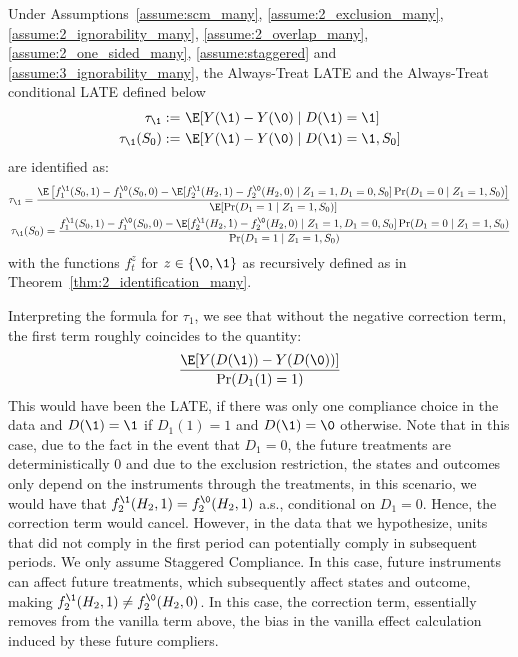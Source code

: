 \begin{theorem}\label{thm:late11_id_many}
    Under Assumptions~\ref{assume:scm_many}, 
 \ref{assume:2_exclusion_many},
 \ref{assume:2_ignorability_many}, \ref{assume:2_overlap_many}, \ref{assume:2_one_sided_many}, \ref{assume:staggered} and \ref{assume:3_ignorability_many}, the Always-Treat LATE and the Always-Treat conditional LATE defined below
    \begin{align}
        \tau_{\1} :=~& \E[Y(\1) - Y(\0)\mid D(\1)=\1]\\
        \tau_{\1}(S_0):=~& \E[Y(\1) - Y(\0)\mid D(\1)=\1, S_0]
    \end{align}
    are identified as:
    \begin{align*}
    \tau_\1 = \frac{\E\left[f_1^{\1}(S_0,1) - f_1^{\0}(S_0, 0) - \E[f_2^{\1}(H_2, 1) - f_2^{\0}(H_2,0)\mid Z_1=1, D_1=0, S_0]\Pr(D_1=0\mid Z_1=1, S_0)\right]}{\E[\Pr(D_1=1\mid Z_1=1, S_0)]}\\
        \tau_\1(S_0) = \frac{f_1^{\1}(S_0,1) - f_1^{\0}(S_0, 0) - \E[f_2^{\1}(H_2, 1) - f_2^{\0}(H_2,0)\mid Z_1=1, D_1=0, S_0]\Pr(D_1=0\mid Z_1=1, S_0)}{\Pr(D_1=1\mid Z_1=1, S_0)}
    \end{align*}
with the functions $f_t^{z}$ for $z\in \{\0,\1\}$ as recursively defined as in Theorem~\ref{thm:2_identification_many}.
\end{theorem}

Interpreting the formula for $\tau_1$, we see that without the negative correction term, the first term roughly coincides to the quantity:
\begin{align}
    \frac{\E[Y(D(\1)) - Y(D(\0))]}{\Pr(D_1(1)=1)}
\end{align}
This would have been the LATE, if there was only one compliance choice in the data and $D(\1)=\1$ if $D_1(1)=1$ and $D(\1)=\0$ otherwise. Note that in this case, due to the fact in the event that $D_1=0$, the future treatments are deterministically $0$ and due to the exclusion restriction, the states and outcomes only depend on the instruments through the treatments, in this scenario, we would have that $f_2^{\1}(H_2,1) = f_2^{\0}(H_2,1)$ a.s., conditional on $D_1=0$. Hence, the correction term would cancel. However, in the data that we hypothesize, units that did not comply in the first period can potentially comply in subsequent periods. We only assume Staggered Compliance. In this case, future instruments can affect future treatments, which subsequently affect states and outcome, making $f_2^{\1}(H_2, 1) \neq f_2^{\0}(H_2, 0)$. In this case, the correction term, essentially removes from the vanilla term above, the bias in the vanilla effect calculation induced by these future compliers. 

